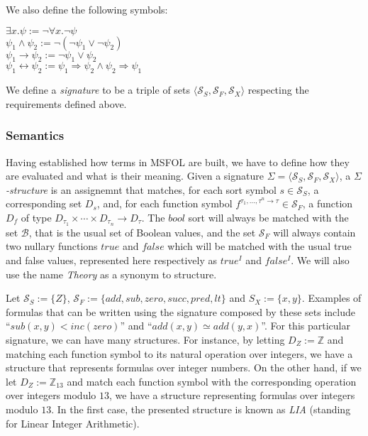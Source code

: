 We also define the following symbols:

\begin{center}
  $\exists x. \psi := \neg \forall x. \neg \psi$\\
  $\psi_{1} \wedge \psi_{2} := \neg (\neg \psi_{1} \vee \neg \psi_{2})$\\
  $\psi_{1} \rightarrow \psi_{2} := \neg \psi_{1} \vee \psi_{2}$\\
  $\psi_{1} \leftrightarrow \psi_{2} := \psi_{1} \Rightarrow \psi_{2} \wedge \psi_{2} \Rightarrow \psi_{1}$
\end{center}

We define a \textit{signature} to be a triple of sets $\langle \mathcal{S}_{S}, \mathcal{S}_{F}, \mathcal{S}_{X} \rangle$ respecting the requirements defined above.

\subsubsection{Semantics}

Having established how terms in MSFOL are built, we have to define how they are evaluated and what is their meaning.
Given a signature $\Sigma = \langle \mathcal{S}_{S}, \mathcal{S}_{F}, \mathcal{S}_{X} \rangle$, a $\Sigma$\textit{-structure} is an assignemnt that matches, for each sort symbol $s \in \mathcal{S}_{S}$, a corresponding set $D_{s}$, and, for each function symbol $f^{\tau_{1}, \ldots, \tau^{n} \rightarrow \tau} \in \mathcal{S}_{F}$, a function $D_{f}$ of type $D_{\tau_{1}} \times \cdots \times D_{\tau_{n}} \rightarrow D_{\tau}$.
The $\textit{bool}$ sort will always be matched with the set $\mathcal{B}$, that is the usual set of Boolean values, and the set $\mathcal{S}_{F}$ will always contain two nullary functions $\textit{true}$ and $\textit{false}$ which will be matched with the usual true and false values, represented here respectively as $true^{I}$ and $false^{I}$. We will also use the name \textit{Theory} as a synonym to structure.

\begin{example}[LIA]\label{ex:lia}
  Let $\mathcal{S}_{S} := \{Z\}$, $\mathcal{S}_{F} := \{add, sub, zero, succ, pred, lt\}$ and
  $S_{X} := \{x, y\}$. Examples of formulas that can be written using the signature composed by these sets include ``$sub(x, y) < inc(zero)$'' and ``$add(x, y) \simeq add(y, x)$''. For this particular signature, we can have many structures. For instance, by letting $D_{Z} := \mathbb{Z}$ and matching each function symbol to its natural operation over integers, we have a structure that represents formulas over integer numbers. On the other hand, if we let $D_{Z} := \mathbb{Z}_{13}$ and match each function symbol with the corresponding operation over integers modulo $13$, we have a structure representing formulas over integers modulo $13$. In the first case, the presented structure is known as \textit{LIA} (standing for Linear Integer Arithmetic).
\end{example}

